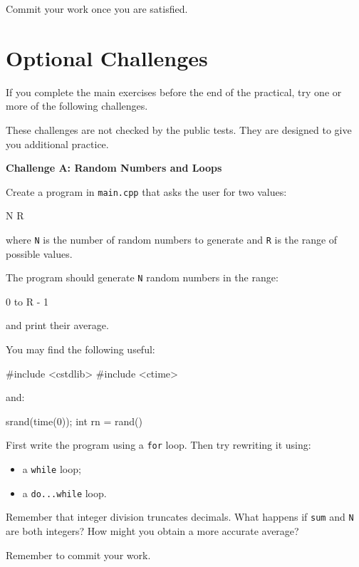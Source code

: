 \documentclass{csc2059practical}
\begin{document}
Commit your work once you are satisfied.

\section{Optional Challenges}

If you complete the main exercises before the end of the practical, try one or more of the following challenges.

\begin{importantnote}
These challenges are not checked by the public tests. They are designed to give you additional practice.
\end{importantnote}

\begin{challengebox}
\textbf{Challenge A: Random Numbers and Loops}

Create a program in \texttt{main.cpp} that asks the user for two values:

\begin{terminal}
N R
\end{terminal}

where \texttt{N} is the number of random numbers to generate and \texttt{R} is the range of possible values.

The program should generate \texttt{N} random numbers in the range:

\begin{terminal}
0 to R - 1
\end{terminal}

and print their average.

You may find the following useful:

\begin{cppcode}
#include <cstdlib>
#include <ctime>
\end{cppcode}

and:

\begin{cppcode}
srand(time(0));
int rn = rand() %
\end{cppcode}

First write the program using a \texttt{for} loop. Then try rewriting it using:

\begin{itemize}
  \item a \texttt{while} loop;
  \item a \texttt{do...while} loop.
\end{itemize}

Remember that integer division truncates decimals. What happens if \texttt{sum} and \texttt{N} are both integers? How might you obtain a more accurate average?

Remember to commit your work.
\end{challengebox}
\end{document}
